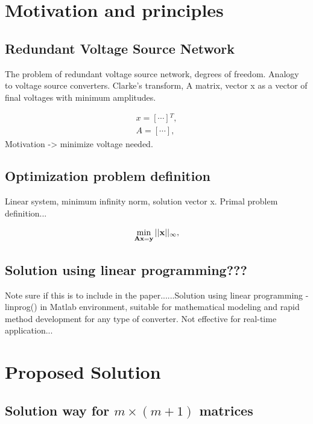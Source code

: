 \documentclass[journal]{IEEEtranTIE}
\theoremstyle{definition}
\begin{document}
\section{Motivation and principles}

\subsection{Redundant Voltage Source Network }

The problem of redundant voltage source network, degrees of freedom.
Analogy to voltage source converters. Clarke's transform, A matrix,
vector x as a vector of final voltages with minimum amplitudes.

\begin{equation}
\begin{aligned}x=\left[\cdots\right]{}^{T},\\
A=\left[\cdots\right],
\end{aligned}
\label{eq:eq2-1}
\end{equation}
Motivation -> minimize voltage needed.

\subsection{Optimization problem definition}

Linear system, minimum infinity norm, solution vector x. Primal problem
definition...

\begin{equation}
\min_{\mathbf{Ax}=\mathbf{y}}||\mathbf{x}||_{\text{\ensuremath{\infty}}},\label{eq:1}
\end{equation}


\subsection{Solution using linear programming???}

Note sure if this is to include in the paper......Solution using linear
programming - linprog() in Matlab environment, suitable for mathematical
modeling and rapid method development for any type of converter. Not
effective for real-time application...

\section{Proposed Solution}

\subsection{Solution way for $m\times(m + 1)$ matrices}
\end{document}
